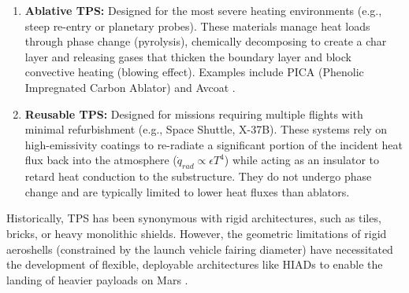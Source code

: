 \begin{enumerate}
    \item \textbf{Ablative TPS:} Designed for the most severe heating environments (e.g., steep re-entry or planetary probes). These materials manage heat loads through phase change (pyrolysis), chemically decomposing to create a char layer and releasing gases that thicken the boundary layer and block convective heating (blowing effect). Examples include PICA (Phenolic Impregnated Carbon Ablator) and Avcoat \cite{TPS-stateofIndustryNASA}.
    
    \item \textbf{Reusable TPS:} Designed for missions requiring multiple flights with minimal refurbishment (e.g., Space Shuttle, X-37B). These systems rely on high-emissivity coatings to re-radiate a significant portion of the incident heat flux back into the atmosphere ($\dot{q}_{rad} \propto \epsilon T^4$) while acting as an insulator to retard heat conduction to the substructure. They do not undergo phase change and are typically limited to lower heat fluxes than ablators.
\end{enumerate}

Historically, TPS has been synonymous with rigid architectures, such as tiles, bricks, or heavy monolithic shields. However, the geometric limitations of rigid aeroshells (constrained by the launch vehicle fairing diameter) have necessitated the development of flexible, deployable architectures like HIADs to enable the landing of heavier payloads on Mars \cite{DiNonnoLOFTID}.

